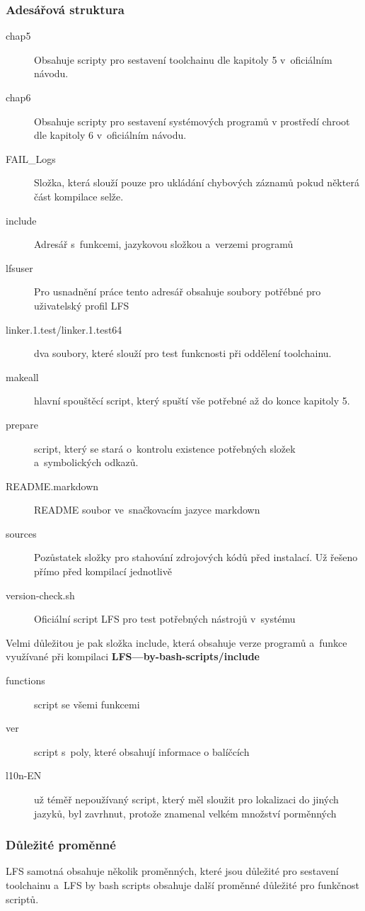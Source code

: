 \documentclass[a4paper,12pt]{article}
\renewcommand{\b}[1]{\textbf{#1}} %
\begin{document}
\subsubsection{Adesářová struktura}
\begin{description}
 \item[chap5] Obsahuje scripty pro sestavení toolchainu dle kapitoly 5 v~oficiálním návodu.
 \item[chap6] Obsahuje scripty pro sestavení systémových programů v prostředí chroot dle kapitoly 6 v~oficiálním návodu.
 \item[FAIL\_Logs] Složka, která slouží pouze pro ukládání chybových záznamů pokud některá část kompilace selže.
 \item[include] Adresář s~funkcemi, jazykovou složkou a~verzemi programů
 \item[lfsuser] Pro usnadnění práce tento adresář obsahuje soubory potřébné pro uživatelský profil LFS
 \item[linker.1.test/linker.1.test64] dva soubory, které slouží pro test funkcnosti při oddělení toolchainu.
 \item[makeall] hlavní spouštěcí script, který spuští vše potřebné až do konce kapitoly 5.
 \item[prepare] script, který se stará o~kontrolu existence potřebných složek a~symbolických odkazů.
 \item[README.markdown] README soubor ve~snačkovacím jazyce markdown
 \item[sources] Pozůstatek složky pro stahování zdrojových kódů před instalací. Už řešeno přímo před kompilací jednotlivě
 \item[version-check.sh] Oficiální script LFS pro test potřebných nástrojů v~systému
 \end{description}
Velmi důležitou je pak složka include, která obsahuje verze programů a~funkce využívané při kompilaci
\b{LFS---by-bash-scripts/include}
\begin{description}
 \item[functions] script se všemi funkcemi
 \item[ver] script s~poly, které obsahují informace o balíčcích
 \item[l10n-EN] už téměř nepoužívaný script, který měl sloužit pro lokalizaci do jiných jazyků, byl zavrhnut, protože znamenal velkém množství porměnných
 \end{description}

\subsubsection{Důležité proměnné}
LFS samotná obsahuje několik proměnných, které jsou důležité pro sestavení toolchainu a~LFS by bash scripts obsahuje další proměnné důležité pro funkčnost scriptů.\\
\end{document}
